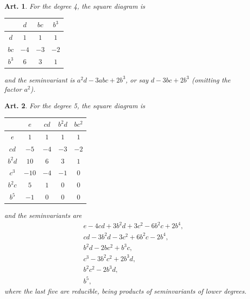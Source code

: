 \documentclass[11pt,a4paper]{article}
\theoremstyle{cayley}
\newtheorem{art}{Art.}[section]
\begin{document}
\setcounter{art}{40}
\begin{art}
For the degree 4, the square diagram is
\begin{center}
\begin{tabular}{c|ccc}
 & $d$ & $bc$ & $b^{3}$ \\
\hline
$d$ & $1$ & $1$ & $1$ \\
$bc$ & $-4$ & $-3$ & $-2$ \\
$b^{3}$ & $6$ & $3$ & $1$ \\
\end{tabular}
\end{center}
and the seminvariant is $a^{2}d - 3abc + 2b^{3}$, or say $d - 3bc + 2b^{3}$ (omitting the factor $a^{2}$).
\end{art}

\setcounter{art}{41}
\begin{art}
For the degree 5, the square diagram is
\begin{center}
\begin{tabular}{c|cccc}
 & $e$ & $cd$ & $b^{2}d$ & $bc^{2}$ \\
\hline
$e$ & $1$ & $1$ & $1$ & $1$ \\
$cd$ & $-5$ & $-4$ & $-3$ & $-2$ \\
$b^{2}d$ & $10$ & $6$ & $3$ & $1$ \\
$c^{3}$ & $-10$ & $-4$ & $-1$ & $0$ \\
$b^{2}c$ & $5$ & $1$ & $0$ & $0$ \\
$b^{5}$ & $-1$ & $0$ & $0$ & $0$ \\
\end{tabular}
\end{center}
and the seminvariants are
\begin{align*}
&\phantom{+}e - 4cd + 3b^{2}d + 3c^{2} - 6b^{2}c + 2b^{4},\\
&\phantom{+}cd - 3b^{2}d - 3c^{2} + 6b^{2}c - 2b^{4},\\
&\phantom{+}b^{2}d - 2bc^{2} + b^{3}c,\\
&\phantom{+}c^{3} - 3b^{2}c^{2} + 2b^{3}d,\\
&\phantom{+}b^{2}c^{2} - 2b^{3}d,\\
&\phantom{+}b^{5},
\end{align*}
where the last five are reducible, being products of seminvariants of lower degrees.
\end{art}
\end{document}
